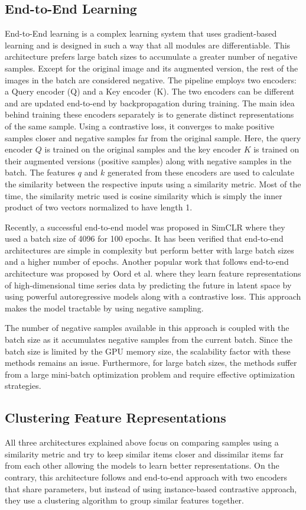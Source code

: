 \documentclass[conference]{IEEEtran}
\begin{document}
\subsection{End-to-End Learning}
End-to-End learning is a complex learning system that uses gradient-based learning and is designed in such a way that all modules are differentiable.
This architecture prefers large batch sizes to accumulate a greater number of negative samples. 
Except for the original image and its augmented version, the rest of the images in the batch are considered negative.
The pipeline employs two encoders: a Query encoder (Q) and a Key encoder (K). The two encoders can be different and are updated end-to-end by backpropagation during training.
The main idea behind training these encoders separately is to generate distinct representations of the same sample. Using a contrastive loss, it converges to make positive samples closer and negative samples far from the original sample.
Here, the query encoder $Q$ is trained on the original samples and the key encoder $K$ is trained on their augmented versions (positive samples) along with negative samples in the batch.
The features $q$ and $k$ generated from these encoders are used to calculate the similarity between the respective inputs using a similarity metric. Most of the time, the similarity metric used is cosine similarity which is simply the inner product 
of two vectors normalized to have length 1.

Recently, a successful end-to-end model was proposed in SimCLR where they used a batch size of 4096 for 100 epochs. It has been verified that end-to-end architectures are simple in complexity 
but perform better with large batch sizes and a higher number of epochs. Another popular work that follows end-to-end architecture was proposed by Oord et al. where they learn feature representations of high-dimensional time series
data by predicting the future in latent space by using powerful autoregressive models along with a contrastive loss. This approach makes the model tractable by using negative sampling. 

The number of negative samples available in this approach is coupled with the batch size as it accumulates negative samples from the current batch.
Since the batch size is limited by the GPU memory size, the scalability factor with these methods remains an issue. Furthermore, for large batch sizes, the methods suffer from a large mini-batch optimization problem and require effective optimization strategies. 

\subsection{Clustering Feature Representations}
All three architectures explained above focus on comparing samples using a similarity metric and try to keep similar items closer and dissimilar items far from each other allowing the models to learn better representations.
On the contrary, this architecture follows and end-to-end approach with two encoders that share parameters, but instead of using instance-based contrastive approach, 
they use a clustering algorithm to group similar features together.
\end{document}
